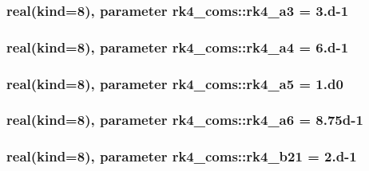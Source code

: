 \subsubsection[{\texorpdfstring{rk4\+\_\+a3}{rk4_a3}}]{\setlength{\rightskip}{0pt plus 5cm}real(kind=8), parameter rk4\+\_\+coms\+::rk4\+\_\+a3 = 3.d-\/1}\hypertarget{namespacerk4__coms_aaa2167ee06ad594c46793e7280b248f7}{}\label{namespacerk4__coms_aaa2167ee06ad594c46793e7280b248f7}
\subsubsection[{\texorpdfstring{rk4\+\_\+a4}{rk4_a4}}]{\setlength{\rightskip}{0pt plus 5cm}real(kind=8), parameter rk4\+\_\+coms\+::rk4\+\_\+a4 = 6.d-\/1}\hypertarget{namespacerk4__coms_aaa712c298024351472a4f80d5020e7fc}{}\label{namespacerk4__coms_aaa712c298024351472a4f80d5020e7fc}
\subsubsection[{\texorpdfstring{rk4\+\_\+a5}{rk4_a5}}]{\setlength{\rightskip}{0pt plus 5cm}real(kind=8), parameter rk4\+\_\+coms\+::rk4\+\_\+a5 = 1.d0}\hypertarget{namespacerk4__coms_ac364eca74fa5b87b0821f6e547e30368}{}\label{namespacerk4__coms_ac364eca74fa5b87b0821f6e547e30368}
\subsubsection[{\texorpdfstring{rk4\+\_\+a6}{rk4_a6}}]{\setlength{\rightskip}{0pt plus 5cm}real(kind=8), parameter rk4\+\_\+coms\+::rk4\+\_\+a6 = 8.\+75d-\/1}\hypertarget{namespacerk4__coms_a572359022b68f636423b3dde68f9c34a}{}\label{namespacerk4__coms_a572359022b68f636423b3dde68f9c34a}
\subsubsection[{\texorpdfstring{rk4\+\_\+b21}{rk4_b21}}]{\setlength{\rightskip}{0pt plus 5cm}real(kind=8), parameter rk4\+\_\+coms\+::rk4\+\_\+b21 = 2.d-\/1}\hypertarget{namespacerk4__coms_a34abdb75b43eceb865d986e7874e03d7}{}\label{namespacerk4__coms_a34abdb75b43eceb865d986e7874e03d7}
